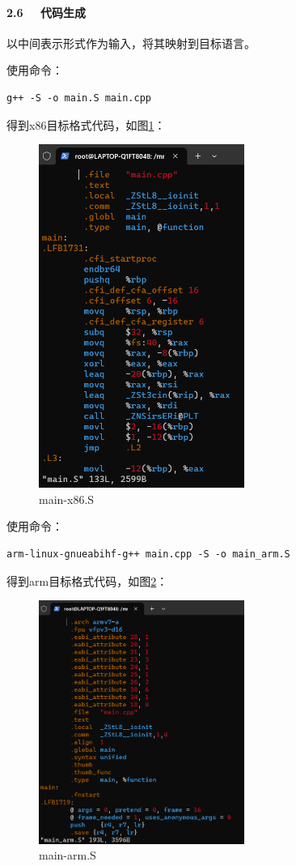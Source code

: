 \documentclass[UTF8,a4paper,10pt]{ctexart}
\begin{document}
\paragraph{2.6 \ \ 代码生成}
以中间表示形式作为输入，将其映射到目标语言。


使用命令：
\begin{lstlisting}[frame=trbl]
  g++ -S -o main.S main.cpp
\end{lstlisting}\par
得到x86目标格式代码，如图\ref{fig:10}：
\begin{figure}[H]
    \centering
    \includegraphics[width=0.6\textwidth,height=0.7\textwidth]{imgs/main_x86.png}
    \caption{main-x86.S}
    \label{fig:10}
\end{figure}


使用命令：
\begin{lstlisting}[frame=trbl]
  arm-linux-gnueabihf-g++ main.cpp -S -o main_arm.S
\end{lstlisting}\par
得到arm目标格式代码，如图\ref{fig:11}：
\begin{figure}[H]
    \centering
    \includegraphics[width=0.6\textwidth,height=0.7\textwidth]{imgs/main_arm.png}
    \caption{main-arm.S}
    \label{fig:11}
\end{figure}
\end{document}
